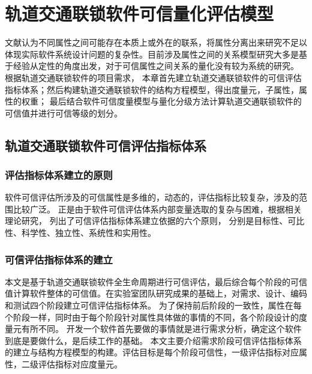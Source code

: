 \chapter{轨道交通联锁软件可信量化评估模型}
\label{ch3}

\begin{kaishu}
文献\cite{Hasselbring2006Toward}认为不同属性之间可能存在本质上或外在的联系，将属性分离出来研究不足以体现实际软件系统设计问题的复杂性。目前涉及属性之间的关系模型研究大多是基于经验从定性的角度出发，对于可信属性之间关系的量化没有较为系统的研究\cite{张卫祥2015软件可信性定量评估}。
根据轨道交通联锁软件的项目需求，
本章首先建立轨道交通联锁软件的可信评估指标体系；然后构建轨道交通联锁软件的结构方程模型，得出度量元，子属性，属性的权重；
最后结合软件可信度量模型与量化分级方法计算轨道交通联锁软件的可信值并进行可信等级的划分。
\end{kaishu}

\section{轨道交通联锁软件可信评估指标体系}
\subsection{评估指标体系建立的原则}
软件可信评估所涉及的可信属性是多维的，动态的，评估指标比较复杂，涉及的范围比较广泛。
正是由于软件可信评估体系内部变量选取的复杂与困难，根据相关理论研究，
列出了可信评估指标体系建立依据的六个原则，
分别是目标性、可比性、科学性、独立性、系统性和实用性\cite{戴君2015基于结构方程模型的可持续供应链绩效评价研究}。

\subsection{可信评估指标体系的建立}
本文是基于轨道交通联锁软件全生命周期进行可信评估，最后综合每个阶段的可信值计算软件整体的可信值。在实验室团队研究成果的基础上，对需求、设计、编码和测试四个阶段建立可信评估指标体系。
为了保持前后阶段的一致性，属性在每个阶段一样，同时由于每个阶段针对属性具体做的事情的不同，各个阶段设计的度量元有所不同。
开发一个软件首先要做的事情就是进行需求分析，确定这个软件到底是要做什么，是后续工作的基础\cite{汪莹2012浅谈软件需求分析}。
本文主要介绍需求阶段可信评估指标体系的建立与结构方程模型的构建。评估目标是每个阶段可信性，一级评估指标对应属性，二级评估指标对应度量元。

